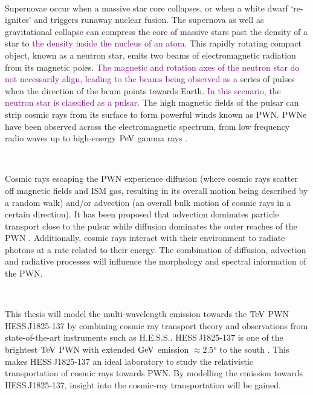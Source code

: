 \par~\par 
Supernovae occur when a massive star core collapses, or when a white dwarf `re-ignites' and triggers runaway nuclear fusion. The supernova as well as gravitational collapse can compress the core of massive stars past the density of a star to \textcolor{purple}{the density inside the nucleus of an atom}. This rapidly rotating compact object, known as a neutron star, emits two beams of electromagnetic radiation from its magnetic poles. \textcolor{purple}{The magnetic and rotation axes of the neutron star do not necessarily align, leading to the beams being observed as a} series of pulses when the direction of the beam points towards Earth. \textcolor{purple}{In this scenario, the neutron star is classified as a pulsar.} The high magnetic fields of the pulsar can strip cosmic rays from its surface to form powerful winds known as PWN. PWNe have been observed across the electromagnetic spectrum, from low frequency radio waves \citep{1968Natur.217..709H} up to high-energy $\PeV$ gamma rays \citep{doi:10.1126/science.abg5137}.
\par~\par
Cosmic rays escaping the PWN experience diffusion (where cosmic rays scatter off magnetic fields and ISM gas, resulting in its overall motion being described by a random walk) and/or advection (an overall bulk motion of cosmic rays in a certain direction). It has been proposed that advection dominates particle transport close to the pulsar while diffusion dominates the outer reaches of the PWN \citep{2020A&A...636A.113G, 2021PhRvD.104l3017R}. Additionally, cosmic rays interact with their environment to radiate photons at a rate related to their energy. The combination of diffusion, advection and radiative processes will influence the morphology and spectral information of the PWN.
\par~\par 
This thesis will model the multi-wavelength emission towards the $\TeV$ PWN \mbox{HESS\,J1825-137} by combining cosmic ray transport theory and observations from state-of-the-art instruments such as H.E.S.S.. \mbox{HESS\,J1825-137} is one of the brightest $\TeV$ PWN with extended $\si{\giga\electronvolt}$ emission $\approx \ang{2.5}$ to the south \citep{2019MNRAS.485.1001A}. This makes \mbox{HESS\,J1825-137} an ideal laboratory to study the relativistic transportation of cosmic rays towards PWN. By modelling the emission towards \mbox{HESS\,J1825-137}, insight into the cosmic-ray transportation will be gained.
\par~\par

